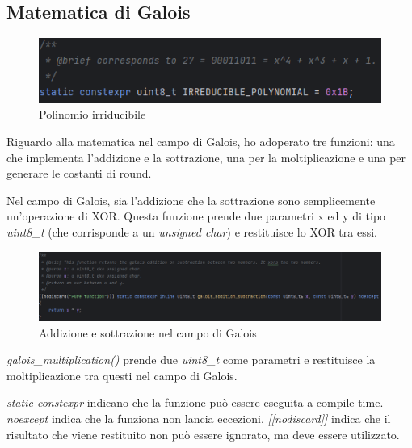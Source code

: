 
\subsection{Matematica di Galois}

\begin{figure}[H]
	\centering
	\includegraphics[width=1\textwidth, height=1\textheight, keepaspectratio]{./images/code/cpp/galois_math/irreducible_polynomial.PNG}
	\caption{Polinomio irriducibile}
	\label{fig:irreducible_polynomial}
\end{figure}

\textsf{\small Riguardo alla matematica nel campo di Galois, ho adoperato tre funzioni: una che implementa l'addizione e la sottrazione, una per la moltiplicazione e una per generare le costanti di round.} %

\textsf{\small Nel campo di Galois, sia l'addizione che la sottrazione sono semplicemente un'operazione di XOR. Questa funzione prende due parametri x ed y di tipo \emph{uint8\_t} (che corrisponde a un \emph{unsigned char}) e restituisce lo XOR tra essi.}

\begin{figure}[H]
	\centering
	\includegraphics[width=1\textwidth, height=1\textheight, keepaspectratio]{./images/code/cpp/galois_math/galois_addition_subtraction.PNG}
	\caption{Addizione e sottrazione nel campo di Galois}
	\label{fig:galois_addition_subtraction}
\end{figure}

\textsf{\small \emph{galois\_multiplication()} prende due \emph{uint8\_t} come parametri e restituisce la moltiplicazione tra questi nel campo di Galois.}

\textsf{\emph{static constexpr} indicano che la funzione può essere eseguita a compile time. \emph{noexcept} indica che la funziona non lancia eccezioni. \emph{[[nodiscard]]} indica che il risultato che viene restituito non può essere ignorato, ma deve essere utilizzato.}

